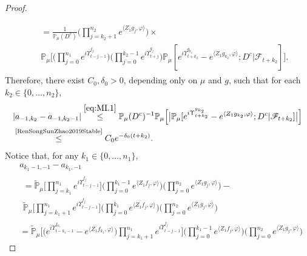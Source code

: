 \documentclass[12pt,a4paper]{amsart}
\theoremstyle{plain}
\theoremstyle{definition}
\numberwithin{equation}{section}
\begin{document}
\begin{proof}
\begin{align}
\begin{multlined}
	\end{multlined}
	\\ \label{eq:MI.1}& \begin{multlined} 
	= \frac{1}{\mathbb{P}_{\mu}(D^c)}  \Big(\prod_{j=k_2+1}^{n_2}e^{\langle Z_1g_j, \varphi\rangle}\Big) \times {}
	\\ \mathbb{P}_{\mu}\Big[\Big(\prod_{j=0}^{n_1}e^{i\Upsilon_{t-j-1}^{f_j}}\Big)\Big(\prod_{j=0}^{k_2-1} e^{i\Upsilon_{t+j}^{g_j}}\Big) \mathbb P_\mu[e^{i\Upsilon^{g_{k_2}}_{t+k_2}}-e^{\langle Z_1g_{k_2}, \varphi\rangle}; D^c|\mathscr F_{t+k_2}] \Big].
	\end{multlined}
\end{align}
	Therefore, there exist $C_0,\delta_0 >0$,  depending only on $\mu$ and $g$, 
  such that  for each $k_2 \in \{0, \dots, n_2 \}$,
\begin{align}
    &| a_{-1,k_2} - a_{-1,k_2-1}|
    \overset{\eqref{eq:MI.1}}\leq \mathbb{P}_{\mu}(D^c)^{-1}\mathbb{P}_{\mu}\Big[\big|\mathbb P_\mu[e^{i\Upsilon^{g_{k_2}}_{t+k_2}}-e^{\langle Z_1g_{k_2}, \varphi\rangle}; D^c|\mathscr F_{t+k_2}]\big|\Big]
    \\&\label{eq:MI.15}\overset{\text{\cite[Proposition 3.5]{RenSongSunZhao2019Stable}}}\leq C_0 e^{-\delta_0 (t+k_2)}.
\end{align}
	Notice that, for any $k_1 \in \{0, \dots , n_1\}$,
	\begin{align}
	&a_{k_1-1,-1} - a_{k_1,-1}
	\\ & \begin{multlined}
	=  \mathbb{\widetilde{P}}_{\mu}\Big[ \prod_{j=k_1}^{n_1} e^{i\Upsilon_{t-j-1}^{f_j}} \Big] \Big(\prod_{j=0}^{k_1-1}e^{\langle Z_1 f_j, \varphi\rangle}\Big) \Big(\prod_{j=0}^{n_2} e^{ \langle Z_1g_j,\varphi \rangle} \Big) - {}
	\\ \mathbb{\widetilde{P}}_{\mu}\Big[ \prod_{j=k_1+1}^{n_1} e^{i\Upsilon_{t-j-1}^{f_j}} \Big] \Big(\prod_{j=0}^{k_1}e^{\langle Z_1 f_j, \varphi\rangle}\Big) \Big(\prod_{j=0}^{n_2} e^{ \langle Z_1g_j,\varphi \rangle} \Big)
	\end{multlined}
	\\& =  \mathbb{\widetilde{P}}_{\mu}\Big[ \big(e^{i\Upsilon_{t-k_1-1}^{f_{k_1}}} -e^{\langle Z_1 f_{k_1}, \varphi\rangle} \big) \prod_{j=k_1+1}^{n_1} e^{i\Upsilon_{t-j-1}^{f_j}} \Big] \Big(\prod_{j=0}^{k_1-1}e^{\langle Z_1 f_j, \varphi\rangle}\Big) \Big(\prod_{j=0}^{n_2} e^{ \langle Z_1g_j,\varphi \rangle} \Big)

\end{align}
\end{proof}
\end{document}
